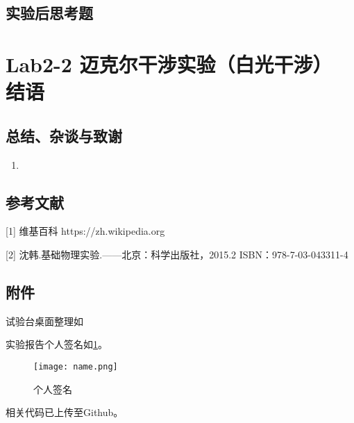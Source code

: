 \documentclass[dvipsnames, svgnames,a4paper,11pt]{article}
\begin{document}
	\subsubsection{}
	
	
	\subsection{实验后思考题}
	
	\begin{question}
		
	\end{question}
	
	\begin{question}
		
	\end{question}
	
	\begin{question}
		
	\end{question}
	
	
	
	\clearpage
	
	\section{Lab2-2 迈克尔干涉实验（白光干涉） \quad\heiti 结语}
	
	\subsection{总结、杂谈与致谢}
	\begin{enumerate}
		\item 
	\end{enumerate}
	
	\subsection{参考文献}
	[1] 维基百科 https://zh.wikipedia.org
	
	[2] 沈韩.基础物理实验.——北京：科学出版社，2015.2 ISBN：978-7-03-043311-4
	
	
	\subsection{附件}
	试验台桌面整理如%
	
	实验报告个人签名如\cref{fig:name}。
	
	\begin{figure}[htbp]
		\centering
		\texttt{[image: name.png]}
		\caption{个人签名}
		\label{fig:name}
	\end{figure}
	
	
	相关代码已上传至Github。
	
	
	
\end{document}
